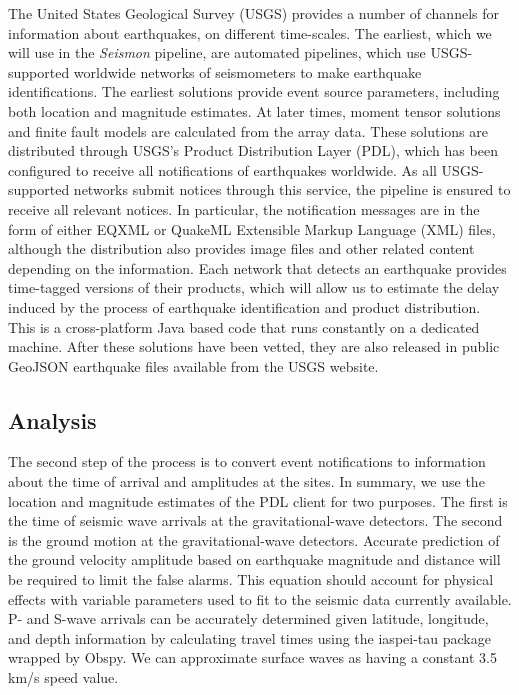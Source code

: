 \documentclass[twocolumn, prl, superscriptaddress]{revtex4}
\begin{document}
The United States Geological Survey (USGS) provides a number of channels for information about earthquakes, on different time-scales. The earliest, which we will use in the \emph{Seismon} pipeline, are automated pipelines, which use USGS-supported worldwide networks of seismometers to make earthquake identifications. The earliest solutions provide event source parameters, including both location and magnitude estimates. At later times, moment tensor solutions and finite fault models are calculated from the array data. These solutions are distributed through USGS's Product Distribution Layer (PDL), which has been configured to receive all notifications of earthquakes worldwide. As all USGS-supported networks submit notices through this service, the pipeline is ensured to receive all relevant notices.
In particular, the notification messages are in the form of either EQXML or QuakeML Extensible Markup Language (XML) files, although the distribution also provides image files and other related content depending on the information. Each network that detects an earthquake provides time-tagged versions of their products, which will allow us to estimate the delay induced by the process of earthquake identification and product distribution. This is a cross-platform Java based code that runs constantly on a dedicated machine. 
After these solutions have been vetted, they are also released in public GeoJSON earthquake files available from the USGS website.

\subsection{Analysis}

The second step of the process is to convert event notifications to information about the time of arrival and amplitudes at the sites.
In summary, we use the location and magnitude estimates of the PDL client for two purposes. 
The first is the time of seismic wave arrivals at the gravitational-wave detectors.
The second is the ground motion at the gravitational-wave detectors.
Accurate prediction of the ground velocity amplitude based on earthquake magnitude and distance will be required to limit the false alarms. 
This equation should account for physical effects with variable parameters used to fit to the seismic data currently available.
P- and S-wave arrivals can be accurately determined given latitude, longitude, and depth information by calculating travel times using the iaspei-tau package \cite{Snoke2009} wrapped by Obspy. We can approximate surface waves as having a constant 3.5\,km/s speed value. 
\end{document}
